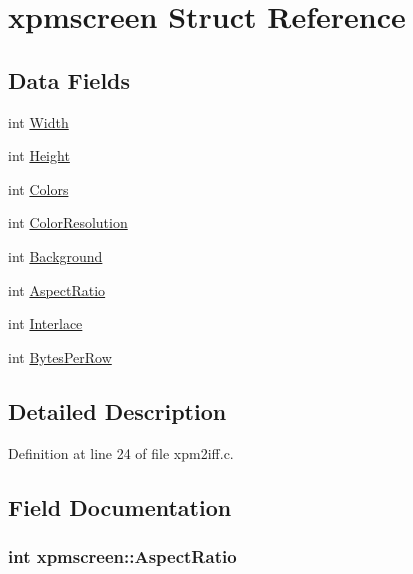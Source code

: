 \hypertarget{structxpmscreen}{\section{xpmscreen Struct Reference}
\label{structxpmscreen}
}
\subsection*{Data Fields}
\begin{DoxyCompactItemize}
\item 
int \hyperlink{structxpmscreen_a1e07e1bcddf0a0dec7d27740c669c706}{Width}
\item 
int \hyperlink{structxpmscreen_a0b3dfa02a3b81a573e8365010a81cd15}{Height}
\item 
int \hyperlink{structxpmscreen_a247650539e8235f8ca9c88fdfc7175dc}{Colors}
\item 
int \hyperlink{structxpmscreen_a3c640f4696b245212bcba9d5e3e01f08}{Color\+Resolution}
\item 
int \hyperlink{structxpmscreen_a51bea1e3bc784d2588ce5c6104927328}{Background}
\item 
int \hyperlink{structxpmscreen_a27e962087ac88544e4f342d7a4a59020}{Aspect\+Ratio}
\item 
int \hyperlink{structxpmscreen_acbfe221573608e3154c8ecd323a51655}{Interlace}
\item 
int \hyperlink{structxpmscreen_a4ea7684c8ea4ef25e996f8d002555c7e}{Bytes\+Per\+Row}
\end{DoxyCompactItemize}


\subsection{Detailed Description}


Definition at line 24 of file xpm2iff.\+c.



\subsection{Field Documentation}
\hypertarget{structxpmscreen_a27e962087ac88544e4f342d7a4a59020}{
\subsubsection[{Aspect\+Ratio}]{\setlength{\rightskip}{0pt plus 5cm}int xpmscreen\+::\+Aspect\+Ratio}}\label{structxpmscreen_a27e962087ac88544e4f342d7a4a59020}


